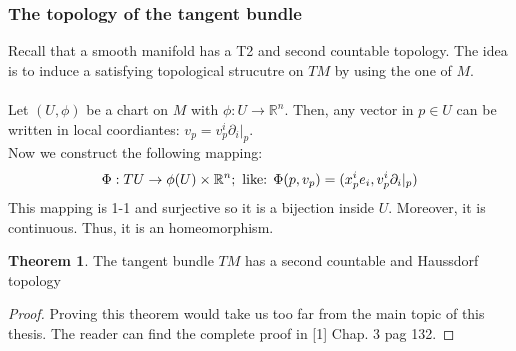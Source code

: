 \documentclass[12pt,a4paper]{report}
\theoremstyle{definition}
\theoremstyle{Theorem}
\newtheorem{Theo}[Def]{Theorem}
\theoremstyle{definition}
\theoremstyle{definition}
\begin{document}
		\subsubsection{The topology of the tangent bundle}
		Recall that a smooth manifold has a T2 and second countable topology. The idea is to induce a satisfying topological strucutre on $TM$ by using the one of $M$.\\
		\\
		Let $(U,\phi)$ be a chart on $M$ with $\phi:U\rightarrow \mathbb{R}^n$. Then, any vector in $p\in U$ can be written in local coordiantes: $v_p=v^i_p\partial_i|_p$.\\
		Now we construct the following mapping:
		$$\Phi:TU\rightarrow \phi(U)\times \mathbb{R}^n; \hbox{ like: }
		\Phi(p,v_p)=(x^i_pe_i,v^i_p\partial_i|_p)$$
		This mapping is 1-1 and surjective so it is a bijection inside $U$. Moreover, it is continuous. Thus, it is an homeomorphism.
		\begin{Theo} \label{Theo_1.1}
			The tangent bundle $TM$ has a second countable and Haussdorf topology
		\end{Theo}
		\begin{proof}
			Proving this theorem would take us too far from the main topic of this thesis. The reader can find the complete proof in [1] Chap. 3 pag 132.
		\end{proof}
\end{document}
